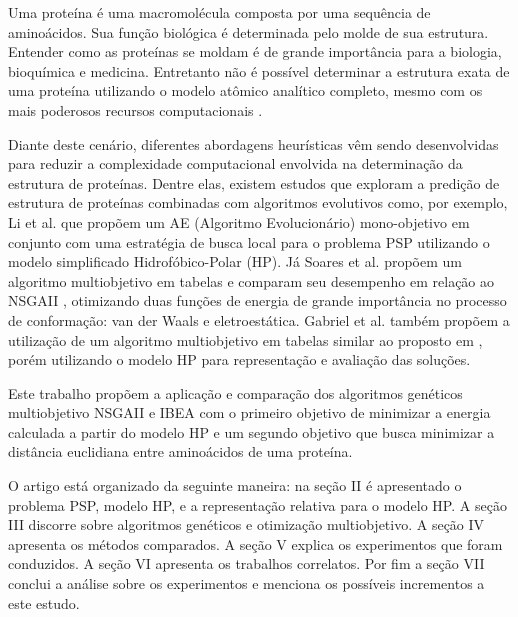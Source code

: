 \documentclass[conference]{IEEEtran}
\begin{document}
Uma proteína é uma macromolécula composta por uma sequência de aminoácidos. Sua  função biológica é determinada pelo molde de sua estrutura. Entender como as proteínas se moldam é de grande importância para a biologia, bioquímica e medicina. Entretanto não é possível determinar a estrutura exata de uma proteína utilizando o modelo atômico analítico completo, mesmo com os mais poderosos recursos computacionais \cite{lopes2008evolutionary}. 

Diante deste cenário, diferentes abordagens heurísticas vêm sendo desenvolvidas para reduzir a complexidade computacional envolvida na determinação da estrutura de proteínas. Dentre elas, existem estudos que exploram a predição de estrutura de proteínas 
combinadas com algoritmos evolutivos como, por exemplo, Li et al. \cite{li2012genetic} que propõem um AE (Algoritmo Evolucionário) mono-objetivo em conjunto com uma estratégia de busca local para o problema PSP utilizando o modelo simplificado Hidrofóbico-Polar (HP). Já Soares et al. \cite{soares2011investigating} propõem um algoritmo multiobjetivo em tabelas e comparam seu desempenho em relação ao NSGAII \cite{deb2002fast}, otimizando duas funções de energia de grande importância no processo de conformação: van der Waals e eletroestática. Gabriel et al. \cite{gabriel2012algoritmos} também propõem a utilização de um algoritmo multiobjetivo em tabelas similar ao proposto em \cite{soares2011investigating}, porém utilizando o modelo HP para representação e avaliação das soluções.

Este trabalho propõem a aplicação e comparação dos algoritmos genéticos multiobjetivo NSGAII e IBEA \cite{zitzler2004indicator} com o primeiro objetivo de minimizar a energia calculada a partir do modelo HP e um segundo objetivo que busca minimizar a distância euclidiana entre aminoácidos de uma proteína.

O artigo está organizado da seguinte maneira: na seção II é apresentado o problema PSP, modelo
HP, e a representação relativa para o modelo HP. A seção III discorre sobre algoritmos genéticos e otimização multiobjetivo. A seção IV apresenta os métodos comparados. A seção V explica os experimentos que foram conduzidos. A seção VI apresenta os trabalhos correlatos. Por fim a seção VII conclui a análise sobre os experimentos e menciona os possíveis incrementos a este estudo.
\end{document}
